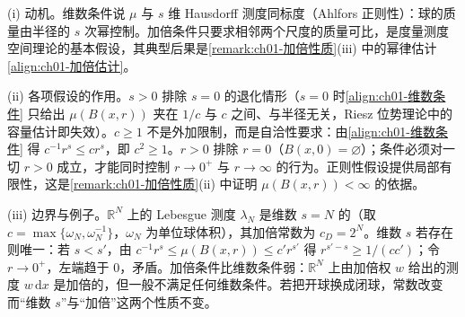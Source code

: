 \documentclass[../../main.tex]{subfiles}%
\begin{document}
\begin{remark}\label{remark:ch01-加倍测度动机}
(i) 动机。维数条件说 $\mu$ 与 $s$ 维 Hausdorff 测度同标度（Ahlfors 正则性）：球的质量由半径的 $s$ 次幂控制。加倍条件只要求相邻两个尺度的质量可比，是度量测度空间理论的基本假设，其典型后果是\cref{remark:ch01-加倍性质}(iii) 中的幂律估计\eqref{align:ch01-加倍估计}。

(ii) 各项假设的作用。$s>0$ 排除 $s=0$ 的退化情形（$s=0$ 时\eqref{align:ch01-维数条件} 只给出 $\mu(B(x,r))$ 夹在 $1/c$ 与 $c$ 之间、与半径无关，Riesz 位势理论中的容量估计即失效）。$c\geqslant1$ 不是外加限制，而是自洽性要求：由\eqref{align:ch01-维数条件} 得 $c^{-1}r^s\leqslant cr^s$，即 $c^2\geqslant1$。$r>0$ 排除 $r=0$（$B(x,0)=\varnothing$）；条件必须对一切 $r>0$ 成立，才能同时控制 $r\to0^+$ 与 $r\to\infty$ 的行为。正则性假设提供局部有限性，这是\cref{remark:ch01-加倍性质}(ii) 中证明 $\mu(B(x,r))<\infty$ 的依据。

(iii) 边界与例子。$\mathbb{R}^N$ 上的 Lebesgue 测度 $\lambda_N$ 是维数 $s=N$ 的（取 $c=\max\{\omega_N,\omega_N^{-1}\}$，$\omega_N$ 为单位球体积），其加倍常数为 $c_D=2^N$。维数 $s$ 若存在则唯一：若 $s<s'$，由 $c^{-1}r^s\leqslant\mu(B(x,r))\leqslant c'r^{s'}$ 得 $r^{s'-s}\geqslant1/(cc')$；令 $r\to0^+$，左端趋于 $0$，矛盾。加倍条件比维数条件弱：$\mathbb{R}^N$ 上由加倍权 $w$ 给出的测度 $w\,\mathrm{d}x$ 是加倍的，但一般不满足任何维数条件。若把开球换成闭球，常数改变而“维数 $s$”与“加倍”这两个性质不变。
\end{remark}
\end{document}
